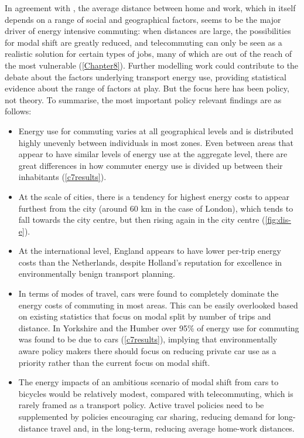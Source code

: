 \documentclass[a4paper, 11pt, twoside]{Thesis}
\begin{document}
In agreement with \citet{Boussauw2010}, the average distance between home and work,
which in itself depends on a range of social and geographical factors,
seems to be the major driver of energy intensive commuting: when distances
are large, the possibilities for modal shift are greatly reduced, and
telecommuting can only be seen as a realistic solution for certain types of
jobs, many of which are out of the reach of the most vulnerable
(\cref{Chapter8}).
Further modelling work could contribute to the debate about the factors
underlying transport energy use, providing statistical evidence about the range
of factors at play. But the focus here has been policy, not theory.
To summarise, the most important policy relevant findings are as follows:
\begin{itemize}
 \item Energy use for commuting varies at all geographical levels
 and is distributed highly unevenly between individuals in most zones.
 Even between areas
 that appear to have similar levels of energy use at the aggregate level, there
 are great differences in how commuter energy use is divided up between their
 inhabitants (\cref{c7results}).
 \item At the scale of cities,
 there is a tendency for highest energy costs to appear furthest from the city (around
 60 km in the case of London), which tends to fall towards the city centre, but then
 rising again in the city centre (\cref{fig:dis-e}).
 \item At the international level, England appears to have lower per-trip energy
 costs than the Netherlands, despite Holland's reputation for excellence in
 environmentally benign transport planning.
 \item In terms of modes of travel, cars were found to completely dominate the
energy costs of commuting in most areas. This can be easily overlooked based on
existing statistics that focus on modal split by number of trips and distance.
In Yorkshire and the Humber over 95\% of energy use for commuting was found to
be due to cars (\cref{c7results}), implying that environmentally aware policy
makers there should focus on reducing private car use as a priority rather than
the current focus on modal shift. 
 \item The energy impacts of an ambitious scenario of modal shift from cars to
 bicycles would be relatively modest, compared with telecommuting, which is
 rarely framed as a transport policy. Active travel policies need to be supplemented
 by policies encouraging car sharing, reducing demand for long-distance travel and,
 in the long-term, reducing average home-work distances.
\end{itemize}
\end{document}
